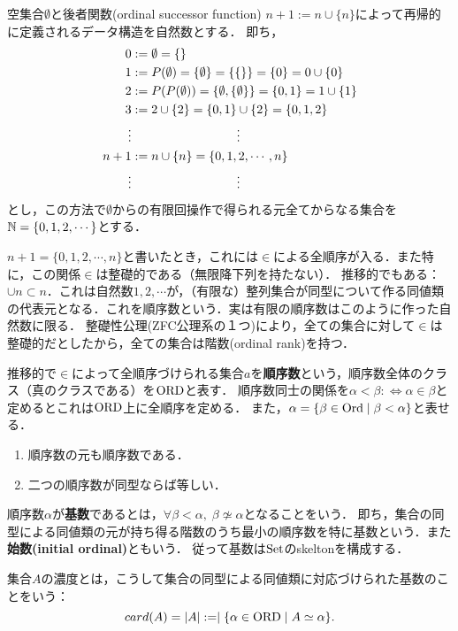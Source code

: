 \documentclass[uplatex, 12pt, dvipdfmx]{jsreport}
\begin{document}
\begin{definition}
    空集合$\emptyset$と後者関数(ordinal successor function) $n+1:=n\cup\{n\}$によって再帰的に定義されるデータ構造を自然数とする．
    即ち，
    \begin{align*}
        0&:=\emptyset=\{\}\\
        1&:=P(\emptyset)=\{\emptyset\}=\{\{\}\}=\{0\}=0\cup\{0\}\\
        2&:=P(P(\emptyset))=\{\emptyset,\{\emptyset\}\}=\{0,1\}=1\cup\{1\}\\
        3&:=2\cup\{2\}=\{0,1\}\cup\{2\}=\{0,1,2\}\\
        \vdots&\hphantom{:=2\cup\{2\}=\{0,1\}}\;\vdots\\
        n+1&:=n\cup\{n\}=\{0,1,2,\cdots,n\}\\
        \vdots&\hphantom{:=2\cup\{2\}=\{0,1\}}\;\vdots
    \end{align*}
    とし，この方法で$\emptyset$からの有限回操作で得られる元全てからなる集合を$\mathbb{N}=\{0,1,2,\cdots\}$とする．
\end{definition}
\begin{remark}[基数と順序数]
    $n+1=\{0,1,2,\cdots,n\}$と書いたとき，これには$\in$による全順序が入る．また特に，この関係$\in$は整礎的である（無限降下列を持たない）．
    推移的でもある：$\cup n\subset n$．これは自然数$1,2,\cdots$が，（有限な）整列集合が同型について作る同値類の代表元となる．これを順序数という．実は有限の順序数はこのように作った自然数に限る．
    整礎性公理(ZFC公理系の１つ)により，全ての集合に対して$\in$は整礎的だとしたから，全ての集合は階数(ordinal rank)を持つ．
\end{remark}
\begin{definition}
    推移的で$\in$によって全順序づけられる集合$a$を\textbf{順序数}という，順序数全体のクラス（真のクラスである）を$\mathrm{ORD}$と表す．
    順序数同士の関係を$\alpha<\beta:\Leftrightarrow\alpha\in\beta$と定めるとこれは$\mathrm{ORD}$上に全順序を定める．
    また，$\alpha=\{\beta\in\mathrm{Ord}\mid\beta<\alpha\}$と表せる．
\end{definition}
\begin{lemma}\mbox{}
    \begin{enumerate}
        \item 順序数の元も順序数である．
        \item 二つの順序数が同型ならば等しい．
    \end{enumerate}
\end{lemma}
\begin{definition}
    順序数$\alpha$が\textbf{基数}であるとは，$\forall\beta<\alpha,\;\beta\not\simeq\alpha$となることをいう．
    即ち，集合の同型による同値類の元が持ち得る階数のうち最小の順序数を特に基数という．また\textbf{始数(initial ordinal)}ともいう．
    従って基数は$\mathrm{Set}$のskeltonを構成する．

    集合$A$の濃度とは，こうして集合の同型による同値類に対応づけられた基数のことをいう：
    \[card(A)=|A|:=\mid\{\alpha\in\mathrm{ORD}\mid A\simeq\alpha\}.\]
\end{definition}
\end{document}
